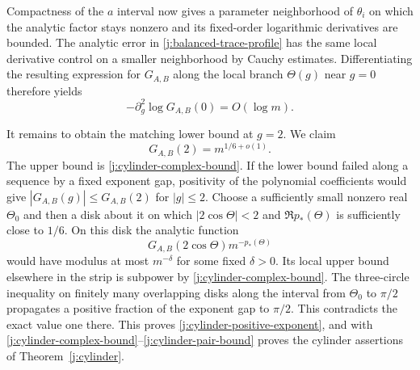 Compactness of the $a$ interval now gives a parameter neighborhood of
$\theta_i$ on which the analytic factor stays nonzero and its fixed-order
logarithmic derivatives are bounded. The analytic error in
\eqref{j:balanced-trace-profile} has the same local derivative control
on a smaller neighborhood by Cauchy estimates.
Differentiating the resulting expression for $G_{A,B}$ along the local
branch $\Theta(g)$ near $g=0$ therefore yields
\begin{equation}\label{j:cylinder-pair-bound}
 -\partial_g^2\log G_{A,B}(0)=O(\log m).
\end{equation}

It remains to obtain the matching lower bound at $g=2$. We claim
\begin{equation}\label{j:cylinder-positive-exponent}
 G_{A,B}(2)=m^{1/6+o(1)}.
\end{equation}
The upper bound is \eqref{j:cylinder-complex-bound}. If the lower bound
failed along a sequence by a fixed exponent gap, positivity of the
polynomial coefficients would give $|G_{A,B}(g)|\le G_{A,B}(2)$ for
$|g|\le2$. Choose a sufficiently small nonzero real $\Theta_0$ and then
a disk about it on which $|2\cos\Theta|<2$ and $\Re p_*(\Theta)$ is
sufficiently close to $1/6$. On this disk the analytic function
\[
 G_{A,B}(2\cos\Theta)m^{-p_*(\Theta)}
\]
would have modulus at most $m^{-\delta}$ for some fixed $\delta>0$. Its local upper
bound elsewhere in the strip is subpower by
\eqref{j:cylinder-complex-bound}. The three-circle inequality on finitely
many overlapping disks along the interval from $\Theta_0$ to $\pi/2$
propagates a positive fraction of the exponent gap to $\pi/2$. This
contradicts the exact value one there. This proves
\eqref{j:cylinder-positive-exponent}, and with
\eqref{j:cylinder-complex-bound}--\eqref{j:cylinder-pair-bound} proves
the cylinder assertions of Theorem~\ref{j:cylinder}.

